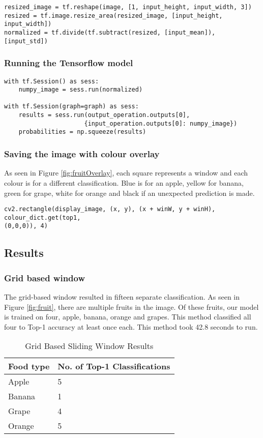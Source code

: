 \begin{lstlisting}[style=Python]
resized_image = tf.reshape(image, [1, input_height, input_width, 3])
resized = tf.image.resize_area(resized_image, [input_height, input_width])
normalized = tf.divide(tf.subtract(resized, [input_mean]), [input_std])
\end{lstlisting}

\subsubsection*{Running the Tensorflow model}
\begin{lstlisting}[style=Python]
with tf.Session() as sess:
	numpy_image = sess.run(normalized)

with tf.Session(graph=graph) as sess:
    results = sess.run(output_operation.outputs[0],
                      {input_operation.outputs[0]: numpy_image})
	probabilities = np.squeeze(results)
\end{lstlisting}

\subsubsection*{Saving the image with colour overlay}
As seen in Figure \ref{fig:fruitOverlay}, each square represents a window and
each colour is for a different classification. Blue is for an apple, yellow for
banana, green for grape, white for orange and black if an unexpected prediction
is made.

\begin{lstlisting}[style=Python]
cv2.rectangle(display_image, (x, y), (x + winW, y + winH), colour_dict.get(top1,
(0,0,0)), 4)
\end{lstlisting}

\subsection*{Results}
\subsubsection*{Grid based window}
The grid-based window resulted in fifteen separate classification. As seen in Figure
\ref{fig:fruit}, there are multiple fruits in the image. Of these fruits, our
model is trained on four, apple, banana, orange and grapes. This method
classified all four to Top-1 accuracy at least once each. This method took 42.8
seconds to run.

\begin{table}[]
	\centering
	\caption{Grid Based Sliding Window Results}
	\label{my-label}
	\begin{tabular}{|l|l|}
	\hline
		\textbf{Food type} & \textbf{No. of Top-1 Classifications} \\ \hline
		Apple     & 5                      \\ \hline
		Banana    & 1                      \\ \hline
		Grape     & 4                      \\ \hline
		Orange    & 5                     \\ \hline
	\end{tabular}
\end{table}

